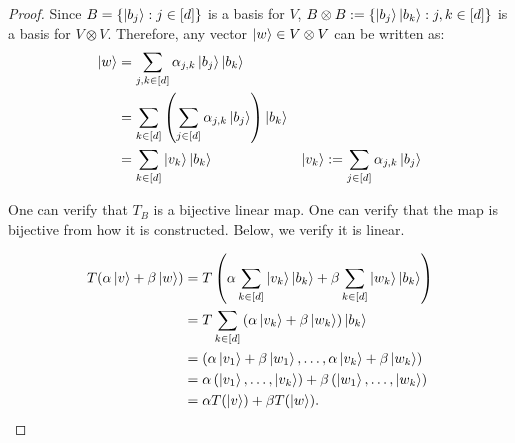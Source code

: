 \begin{proof}
Since $B = \{\ket{b_j}: j \in [d]\}$ is a basis for $V$, $B\otimes B := \{\ket{b_j}\ket{b_k}: j,k \in [d] \}$ is a basis for $V \otimes V$. Therefore, any vector $\ket{w} \in V \otimes V$ can be written as:
\begin{align*}
    \ket{w} &= \sum\limits_{j, k \in [d]} \alpha_{j,k} \ket{b_j} \ket{b_k} \\
    &= \sum\limits_{k \in [d]} \left(\sum\limits_{j \in [d]} \alpha_{j,k} \ket{b_j}\right) \ket{b_k}\\
    &= \sum\limits_{k \in [d]} \ket{v_k} \ket{b_k} & \ket{v_k} := \sum\limits_{j \in [d]} \alpha_{j,k} \ket{b_j}
\end{align*}

One can verify that $T_B$ is a bijective linear map. One can verify that the map is bijective from how it is constructed. Below, we verify it is linear.

\begin{align*}
    T(\alpha \ket{v} + \beta \ket{w}) &= T \left( \alpha \sum\limits_{k \in [d]} \ket{v_k} \ket{b_k} + \beta \sum\limits_{k \in [d]} \ket{w_k} \ket{b_k} \right)\\
    &= T \sum\limits_{k \in [d]} \left(\alpha \ket{v_k} + \beta \ket{w_k}\right) \ket{b_k}\\
    &= \left(\alpha \ket{v_1} + \beta\ket{w_1}, \dots, \alpha \ket{v_k} + \beta \ket{w_k}\right)\\
    &= \alpha \left( \ket{v_1}, \dots, \ket{v_k} \right) + \beta \left(\ket{w_1}, \dots, \ket{w_k} \right)\\
    &= \alpha T(\ket{v}) + \beta T(\ket{w}).
\end{align*}



\end{proof}

